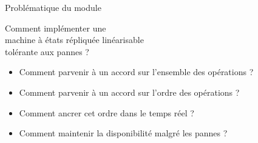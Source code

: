 
\begingroup

\begin{frame}{Problématique du module}
  
  \begin{center}
    \alert{Comment implémenter une
      \\ machine à états répliquée linéarisable
      \\ tolérante aux pannes ?}
  \end{center}

  \vspace{5mm}
  \begin{itemize}
  \item Comment parvenir à un accord sur l'ensemble des opérations ?
  \item Comment parvenir à un accord sur l'ordre des opérations ?
  \item Comment ancrer cet ordre dans le temps réel ? 
  \item Comment maintenir la disponibilité malgré les pannes ?
  \end{itemize}
  
\end{frame}

\endgroup
\endinput
